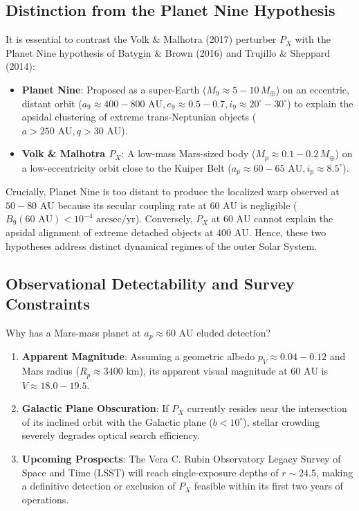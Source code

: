 \documentclass[11pt,a4paper]{article}
\begin{document}
\subsection{Distinction from the Planet Nine Hypothesis}
It is essential to contrast the Volk \& Malhotra (2017) perturber $P_X$ with the Planet Nine hypothesis of Batygin \& Brown (2016) and Trujillo \& Sheppard (2014):
\begin{itemize}
  \item \textbf{Planet Nine}: Proposed as a super-Earth ($M_9 \approx 5 - 10\,M_\oplus$) on an eccentric, distant orbit ($a_9 \approx 400 - 800\text{ AU}, e_9 \approx 0.5 - 0.7, i_9 \approx 20^\circ - 30^\circ$) to explain the apsidal clustering of extreme trans-Neptunian objects ($a > 250\text{ AU}, q > 30\text{ AU}$).
  \item \textbf{Volk \& Malhotra $P_X$}: A low-mass Mars-sized body ($M_p \approx 0.1 - 0.2\,M_\oplus$) on a low-eccentricity orbit close to the Kuiper Belt ($a_p \approx 60 - 65\text{ AU}, i_p \approx 8.5^\circ$).
\end{itemize}
Crucially, Planet Nine is too distant to produce the localized warp observed at $50-80\text{ AU}$ because its secular coupling rate at $60\text{ AU}$ is negligible ($B_9(60\text{ AU}) < 10^{-4}\text{ arcsec/yr}$). Conversely, $P_X$ at $60\text{ AU}$ cannot explain the apsidal alignment of extreme detached objects at $400\text{ AU}$. Hence, these two hypotheses address distinct dynamical regimes of the outer Solar System.

\subsection{Observational Detectability and Survey Constraints}
Why has a Mars-mass planet at $a_p \approx 60\text{ AU}$ eluded detection?
\begin{enumerate}
  \item \textbf{Apparent Magnitude}: Assuming a geometric albedo $p_V \approx 0.04 - 0.12$ and Mars radius ($R_p \approx 3400\text{ km}$), its apparent visual magnitude at $60\text{ AU}$ is $V \approx 18.0 - 19.5$.
  \item \textbf{Galactic Plane Obscuration}: If $P_X$ currently resides near the intersection of its inclined orbit with the Galactic plane ($b < 10^\circ$), stellar crowding severely degrades optical search efficiency.
  \item \textbf{Upcoming Prospects}: The Vera C. Rubin Observatory Legacy Survey of Space and Time (LSST) will reach single-exposure depths of $r \sim 24.5$, making a definitive detection or exclusion of $P_X$ feasible within its first two years of operations.
\end{enumerate}
\end{document}
